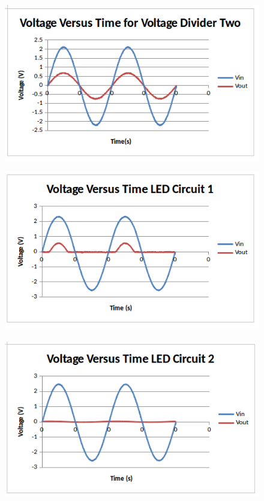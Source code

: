 \documentclass[10pt]{article}
\begin{document}
\begin{figure}[H]
	\centering
	\includegraphics[width=\textwidth]{DividerTwo}
\end{figure}
\begin{figure}[H]
	\centering
	\includegraphics[width=\textwidth]{LED1}
\end{figure}
\begin{figure}[H]
	\centering
	\includegraphics[width=\textwidth]{LED2}
\end{figure}
\end{document}
